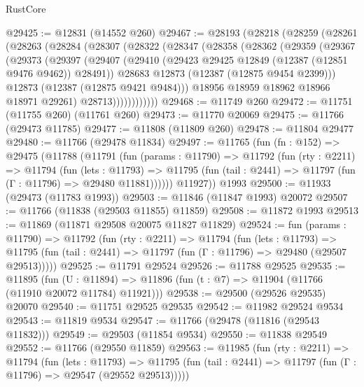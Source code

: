 \begin{lexlean}{RustCore}
\begin{coremodule}
@29425 := @12831 (@14552 @260)
@29467 := @28193
    (@28218
      (@28259
        (@28261
          (@28263
            (@28284
              (@28307
                (@28322
                  (@28347
                    (@28358
                      (@28362
                        (@29359
                          (@29367
                            (@29373
                              (@29397
                                (@29407
                                  (@29410
                                    (@29423 @29425 @12849 (@12387 (@12851 @9476 @9462)) @28491))
                                  @28683
                                  @12873
                                  (@12387 (@12875 @9454 @2399)))
                                @12873
                                (@12387 (@12875 @9421 @9484)))
                              @18956
                              @18959
                              @18962
                              @18966
                              @18971
                              @29261)
                            @28713))))))))))))
@29468 := @11749 @260
@29472 := @11751 (@11755 @260) (@11761 @260)
@29473 := @11770 @20069
@29475 := @11766 (@29473 @11785)
@29477 := @11808 (@11809 @260)
@29478 := @11804 @29477
@29480 := @11766 (@29478 @11834)
@29497 := @11765
    (fun (fn : @152) =>
    @29475
      (@11788
        (@11791
          (fun (params : @11790) =>
          @11792
            (fun (rty : @2211) =>
            @11794
              (fun (lets : @11793) =>
              @11795 (fun (tail : @2441) => @11797 (fun (Γ : @11796) => @29480 @11881))))))
        @11927))
    @1993
@29500 := @11933 (@29473 (@11783 @1993))
@29503 := @11846 (@11847 @1993) @20072
@29507 := @11766 (@11838 (@29503 @11855) @11859)
@29508 := @11872 @1993
@29513 := @11869 (@11871 @29508 @20075 @11827 @11829)
@29524 := fun (params : @11790) =>
  @11792
    (fun (rty : @2211) =>
    @11794
      (fun (lets : @11793) =>
      @11795 (fun (tail : @2441) => @11797 (fun (Γ : @11796) => @29480 (@29507 @29513)))))
@29525 := @11791 @29524
@29526 := @11788 @29525
@29535 := @11895
    (fun (U : @11894) => @11896 (fun (t : @7) => @11904 (@11766 (@11910 @20072 @11784) @11921)))
@29538 := @29500 (@29526 @29535) @20070
@29540 := @11751 @29525 @29535
@29542 := @11982 @29524 @9534
@29543 := @11819 @9534
@29547 := @11766 (@29478 (@11816 (@29543 @11832)))
@29549 := @29503 (@11854 @9534)
@29550 := @11838 @29549
@29552 := @11766 (@29550 @11859)
@29563 := @11985
    (fun (rty : @2211) =>
    @11794
      (fun (lets : @11793) =>
      @11795 (fun (tail : @2441) => @11797 (fun (Γ : @11796) => @29547 (@29552 @29513)))))

\end{coremodule}
\end{lexlean}

